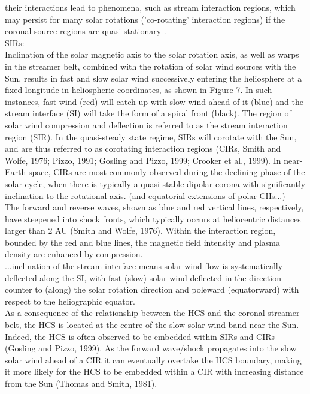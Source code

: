 their interactions lead to phenomena, such as stream interaction regions, which may persist for many solar rotations ('co-rotating' interaction regions) if the coronal source regions are quasi-stationary \citep{Balogh1999}.\\


\citet{Owens2013} SIRs:\\
Inclination of the solar magnetic axis to the solar rotation axis, as well as warps in the streamer belt, combined with the rotation of solar wind sources with the Sun, results in fast and slow solar wind successively entering the heliosphere at a fixed longitude in heliospheric coordinates, as shown in Figure 7. In such instances, fast wind (red) will catch up with slow wind ahead of it (blue) and the stream interface (SI) will take the form of a spiral front (black). The region of solar wind compression and deflection is referred to as the stream interaction region (SIR). In the quasi-steady state regime, SIRs will corotate with the Sun, and are thus referred to as corotating interaction regions (CIRs, Smith and Wolfe, 1976; Pizzo, 1991; Gosling and Pizzo, 1999; Crooker et al., 1999). In near-Earth space, CIRs are most commonly observed during the declining phase of the solar cycle, when there is typically a quasi-stable dipolar corona with significantly inclination to the rotational axis. (and equatorial extensions of polar CHs...)\\
The forward and reverse waves, shown as blue and red vertical lines, respectively, have steepened into shock fronts, which typically occurs at heliocentric distances larger than 2 AU (Smith and Wolfe, 1976). Within the interaction region, bounded by the red and blue lines, the magnetic field intensity and plasma density are enhanced by compression.\\
...inclination of the stream interface means solar wind flow is systematically deflected along the SI, with fast (slow) solar wind deflected in the direction counter to (along) the solar rotation direction and poleward (equatorward) with respect to the heliographic equator.\\
As a consequence of the relationship between the HCS and the coronal streamer belt, the HCS is located at the centre of the slow solar wind band near the Sun. Indeed, the HCS is often observed to be embedded within SIRs and CIRs (Gosling and Pizzo, 1999). As the forward wave/shock propagates into the slow solar wind ahead of a CIR it can eventually overtake the HCS boundary, making it more likely for the HCS to be embedded within a CIR with increasing distance from the Sun (Thomas and Smith, 1981).\\

